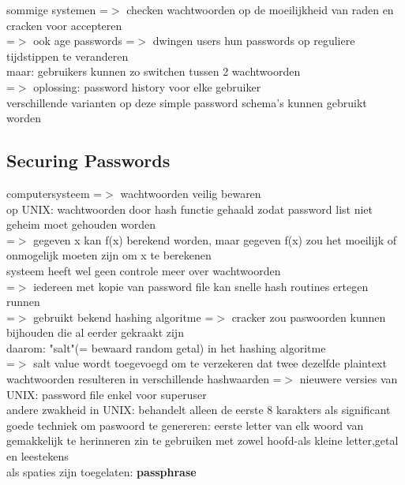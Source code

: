 \documentclass{report}
\begin{document}
sommige systemen =$>$ checken wachtwoorden op de moeilijkheid van raden en cracken voor accepteren
\\=$>$ ook age passwords =$>$ dwingen users hun passwords op reguliere tijdstippen te veranderen
\\maar: gebruikers kunnen zo switchen tussen 2 wachtwoorden
\\=$>$ oplossing: password history voor elke gebruiker
\\ verschillende varianten op deze simple password schema's kunnen gebruikt worden

\subsection{Securing Passwords}
computersysteem =$>$ wachtwoorden veilig bewaren
\\ op UNIX: wachtwoorden door hash functie gehaald zodat password list niet geheim moet gehouden worden
\\ =$>$ gegeven x kan f(x) berekend worden, maar gegeven f(x) zou het moeilijk of onmogelijk moeten zijn om x te berekenen
\\systeem heeft wel geen controle meer over wachtwoorden
\\=$>$ iedereen met kopie van password file kan snelle hash routines ertegen runnen
\\=$>$ gebruikt bekend hashing algoritme =$>$ cracker zou paswoorden kunnen bijhouden die al eerder gekraakt zijn
\\daarom: "salt"(= bewaard random getal) in het hashing algoritme
\\=$>$ salt value wordt toegevoegd om te verzekeren dat twee dezelfde plaintext wachtwoorden resulteren in verschillende hashwaarden
=$>$ nieuwere versies van UNIX: password file enkel voor superuser
\\ andere zwakheid in UNIX: behandelt alleen de eerste 8 karakters als significant 
\\goede techniek om paswoord te genereren:
eerste letter van elk woord van gemakkelijk te herinneren zin te gebruiken met zowel hoofd-als kleine letter,getal en leestekens
\\ als spaties zijn toegelaten: \textbf{passphrase}
\end{document}
